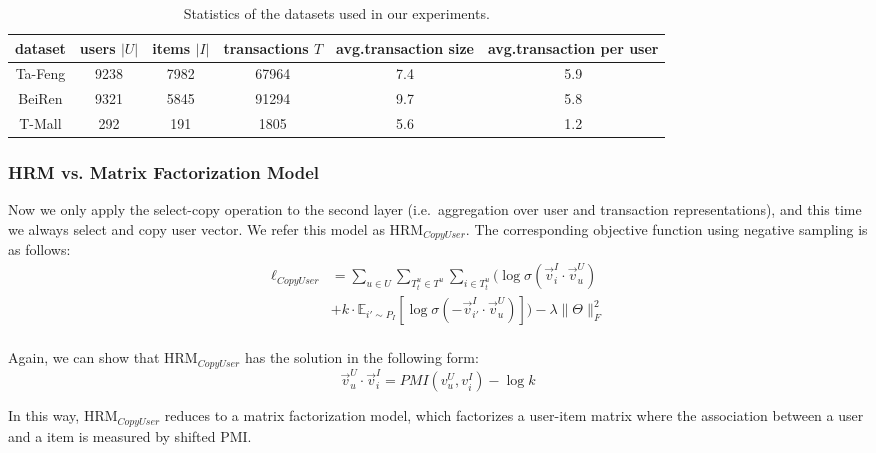 \documentclass[10pt,journal,compsoc]{IEEEtran}
\begin{document}
\begin{table*}[htbp]
\small
\centering
\caption{Statistics of the datasets used in our experiments.}\label{t:t1}
\begin{tabular}{cccccc}
\toprule
 dataset& users $|U|$& items $|I|$& transactions $T$&avg.transaction size& avg.transaction per user\\
\midrule
Ta-Feng &   9238 &   7982 &  67964&  7.4&  5.9\\ %
BeiRen & 9321& 5845& 91294&   9.7&5.8\\ %
T-Mall & 292& 191& 1805&    5.6&1.2\\ %
\bottomrule
\end{tabular}
\end{table*}

\subsubsection{HRM vs. Matrix Factorization Model}
Now we only apply the select-copy operation to the second layer (i.e.~aggregation over user and transaction representations), and this time we always select and copy user vector. We refer this model as HRM$_{CopyUser}$. The corresponding objective function using negative sampling is as follows:
\begin{displaymath}
    \begin{aligned}
  \ell_{CopyUser} &= \sum_{u\in U}\sum_{T^u_t\in T^u} \sum_{i\in T^u_t}\Big( \log\sigma(\vec{v}^I_i\cdot\vec{v}^U_u)\\
        &+k\cdot \mathbb{E}_{i'\sim P_I}[\log\sigma(-\vec{v}^I_{i'}\cdot\vec{v}^U_u)]\Big) -\lambda\|\Theta\|^2_F\\
   \end{aligned}
\end{displaymath}

Again, we can show that HRM$_{CopyUser}$ has the solution in the following form:
\begin{displaymath}
\vec{v}^U_u\cdot\vec{v}^I_i=PMI(v^U_u,v^I_i)-\log k
\end{displaymath}

In this way, HRM$_{CopyUser}$ reduces to a matrix factorization model, which factorizes a user-item matrix where the association between a user and a item is measured by shifted PMI.
\end{document}
